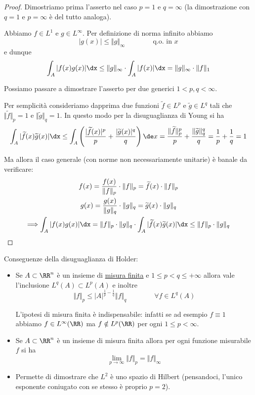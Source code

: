 \begin{proof}
Dimostriamo prima l'asserto nel caso $p=1$ e $q=\infty$ (la dimostrazione con $q=1$ e $p=\infty$ è del tutto analoga).

Abbiamo $f\in L^1$ e $g\in L^{\infty}$. Per definizione di norma infinito abbiamo 
$$
|g(x)| \leq \Vert g \Vert_{\infty} \qquad\qquad\text{q.o. in }x
$$
e dunque
$$
\int_A |f(x) g(x)| \dx \leq \Vert g \Vert_{\infty}\cdot \int_A |f(x)| \dx = \Vert g \Vert_{\infty}\cdot \Vert f \Vert_{1}
$$

Possiamo passare a dimostrare l'asserto per due generici $1<p,q<\infty$. 

Per semplicità consideriamo dapprima due funzioni $\widetilde{f}\in L^p$ e $\widetilde{g}\in L^q$ tali che $\Vert \widetilde{f}\Vert_p=1$ e $\Vert \widetilde{g}\Vert_q=1$. In questo modo per la disuguaglianza di Young si ha
\begin{equation*}
\int_A | \widetilde{f}(x) \widetilde{g}(x)| \dx\leq \int_A \left(\frac{|\widetilde{f}(x)|^p}{p}+\frac{|\widetilde{g}(x)|^q}{q} \right)\de x =\frac{\Vert \widetilde{f}\Vert_p^p}{p}+\frac{\Vert \widetilde{g}\Vert_q^q}{q}=\frac{1}{p}+\frac{1}{q}=1
\end{equation*} 

Ma allora il caso generale (con norme non necessariamente unitarie) è banale da verificare:
\begin{gather*}
f(x)=\frac{f(x)}{\Vert f \Vert_{p}} \cdot \Vert f \Vert_{p} = \widetilde{f}(x)\cdot \Vert f \Vert_{p} \\
g(x)=\frac{g(x)}{\Vert g \Vert_{q}} \cdot \Vert g \Vert_{q} = \widetilde{g}(x)\cdot \Vert g \Vert_{q} \\
\Longrightarrow \int_A | f(x) g(x)| \dx =\Vert f \Vert_{p}\cdot \Vert g \Vert_{q} \cdot \int_A | \widetilde{f}(x) \widetilde{g}(x)| \dx \leq \Vert f \Vert_{p}\cdot \Vert g \Vert_{q}
\end{gather*}
\end{proof}

\newpage

Conseguenze della disuguaglianza di Holder:
\begin{itemize}
    \item Se $A\subset\RR^n$ è un insieme di \underline{misura finita} e $1\leq p<q\leq+\infty$ allora vale l'inclusione $L^q(A)\subset L^p(A)$ e inoltre
    $$
    \Vert f \Vert_p\leq |A|^{\frac{1}{p}-\frac{1}{q}}\Vert f\Vert_q \qquad \qquad \forall f\in L^q(A) 
    $$
    \begin{rem}
    L'ipotesi di misura finita è indispensabile: infatti se ad esempio $f\equiv 1$ abbiamo $f\in L^\infty(\RR)$ ma $f\notin L^p(\RR)$ per ogni $1\leq p<\infty$.
    \end{rem}

    \item Se $A\subset\RR^n$ è un insieme di misura finita allora per ogni funzione misurabile $f$ si ha
    $$
    \lim_{p\to\infty}\Vert f\Vert_p=\Vert f\Vert_{\infty}
    $$

    \item Permette di dimostrare che $L^2$ è uno spazio di Hilbert (pensandoci, l'unico esponente coniugato con se stesso è proprio $p=2$).
\end{itemize}

